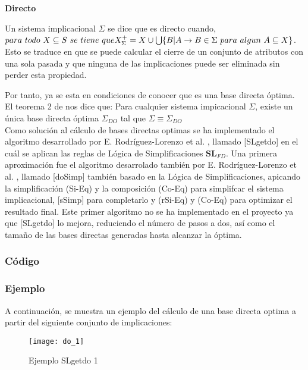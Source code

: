 \textbf{Directo}

Un sistema implicacional \( \Sigma \) se dice que es directo cuando, \( para \ todo \ X \subseteq S \ se \ tiene \ que \\ X^+_{\Sigma} =  X \cup \bigcup\{ B | A \to B \in \Sigma \ para \ algun \ A \subseteq X \} \). Esto se traduce en que se puede calcular el cierre de un conjunto de atributos con una sola pasada y que ninguna de las implicaciones puede ser eliminada sin perder esta propiedad.

Por tanto, ya se esta en condiciones de conocer que es una base directa \'optima.\\

El teorema 2 de \cite{DO2} nos dice que: 
Para cualquier sistema impicacional \(\Sigma\), existe un \'unica base directa \'optima \(\Sigma_{DO}\) tal que \(\Sigma \equiv \Sigma_{DO} \)\\

Como soluci\'on al c\'alculo de bases directas optimas se ha implementado el algoritmo desarrollado por  E. Rodr\'iguez-Lorenzo et al. \cite{DO2}, llamado [SLgetdo] en el cu\'al se aplican las reglas de L\'ogica de Simplificaciones \(\textbf{SL}_{FD}\). Una primera aproximaci\'on  fue el algoritmo desarrolado tambi\'en por E. Rodr\'iguez-Lorenzo et al. \cite{doSimp}, llamado [doSimp] tambi\'en basado en la L\'ogica de Simplificaciones, apicando la simplificaci\'on (Si-Eq) y la composici\'on (Co-Eq) para simplifcar el sistema implicacional, [sSimp] para completarlo y (rSi-Eq) y (Co-Eq) para optimizar el resultado final. Este primer algoritmo no se ha implementado en el proyecto ya que [SLgetdo] lo mejora, reduciendo el n\'umero de pasos a dos, as\'i como el tama\~no de las bases directas generadas hasta alcanzar la \'optima.
\newpage
\subsubsection{C\'odigo} 

\newpage
\subsubsection{Ejemplo} 
A continuaci\'on, se muestra un ejemplo del c\'alculo de una base directa optima a partir del siguiente conjunto de implicaciones: 
\begin{figure}[H]
    \centering
    \texttt{[image: do\_1]}
    \caption{Ejemplo SLgetdo 1}
    \label{fig:do_1}
\end{figure} 


